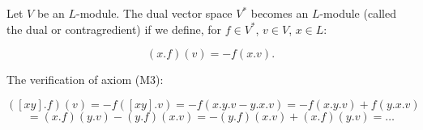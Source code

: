 Let $V$ be an $L$-module. The dual vector space $V^*$ becomes an $L$-module (called the dual or contragredient) if we define, for $f \in V^*$, $v \in V$, $x \in L$:

$$(x.f)(v) = -f(x.v).$$

The verification of axiom (M3):

$$([xy].f)(v) = -f([xy].v) = -f(x.y.v - y.x.v) = -f(x.y.v) + f(y.x.v)$$
$$= (x.f)(y.v) - (y.f)(x.v) = -(y.f)(x.v) + (x.f)(y.v) = \ldots$$
